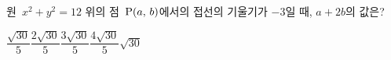 원~$x^2+y^2=12$ 위의 점~$\mathrm{P}(a,\,b)$에서의 접선의 기울기가 $-3$일 때, $a+2b$의 값은? 
\begin{choices32}{$\dfrac{\sqrt{30}}{5}$}{$\dfrac{2\sqrt{30}}{5}$}{$\dfrac{3\sqrt{30}}{5}$}{$\dfrac{4\sqrt{30}}{5}$}{$\sqrt{30}$}\end{choices32}
